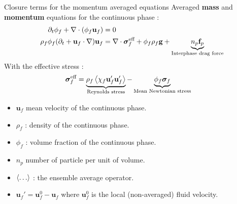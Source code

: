 \documentclass{sintefbeamer}
\begin{document}
\begin{frame}{Closure terms for the momentum averaged equations }
  Averaged \textbf{mass} and \textbf{momentum} equations for the continuous phase :
\begin{align*}
  \partial_t \phi_f   
  + \mathbf{\nabla}\cdot (\phi_f \textbf{u}_f)
  &= 
  0\\
  \rho_f\phi_f (\partial_t + \textbf{u}_f \cdot\mathbf{\nabla})\textbf{u}_f
  &= 
  \mathbf{\nabla}\cdot\bm\sigma_f^\text{eff}
  + \phi_f  \rho_f \textbf{g}
  + 
  \underbrace{
    n_p \textbf{f}_p
  }_\text{Interphase drag force}
\end{align*}
With the effective stress : 
\begin{align*}
  &\bm{\sigma}_f^\text{eff}
  = 
   \underbrace{\rho_f\left<\chi_f \textbf{u}_f'\textbf{u}_f'\right>}_\text{Reynolds stress}
    - \underbrace{\phi_f \bm{\sigma}_f}_\text{Mean Newtonian stress}
\end{align*}
\begin{itemize}
  \item $\textbf{u}_f$ mean velocity of the continuous phase.  
  \item $\rho_f$ : density of the continuous phase. 
  \item $\phi_f$ : volume fraction of the continuous phase. 
  \item $n_p$ number of particle per unit of volume. 
  \item $\left<\ldots\right>$ : the ensemble average operator. 
  \item $\textbf{u}_f' = \textbf{u}^0_f - \textbf{u}_f$ where $\textbf{u}_f^0$ is the local (non-averaged) fluid velocity. 
\end{itemize}
\end{frame}
\end{document}
